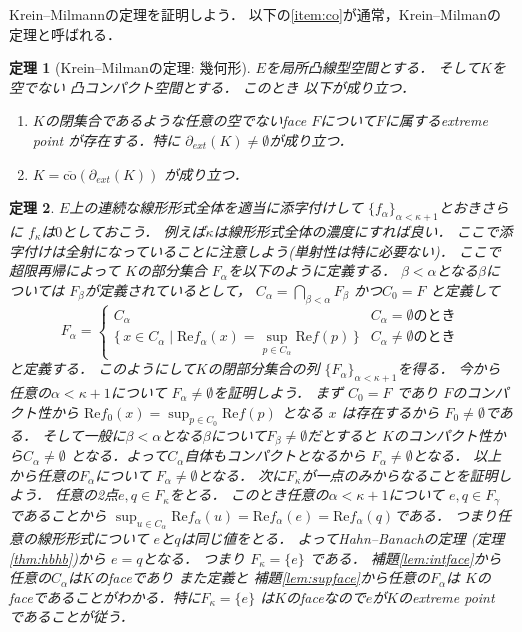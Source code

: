\documentclass[leqno, a4paper, 12pt]{jsarticle}
\newtheorem{thm}{定理}
\newcommand{\myre}{\mathrm{Re}}
\newcommand{\myextreme}[1]{\partial_{ext}(#1)}
\newcommand{\mycco}[1]{\overline{\mathrm{co}}(#1)}
\begin{document}
Krein--Milmannの定理を証明しよう．
以下の\ref{item:co}が通常，Krein--Milmanの定理と呼ばれる．
\begin{thm}[Krein--Milmanの定理: 幾何形]
$E$を局所凸線型空間とする．
そして$K$を
空でない
凸コンパクト空間とする．
このとき
以下が成り立つ．
\begin{enumerate}[label=\textup{(\arabic*)}]
\item\label{item:nonempty}
$K$の閉集合であるような任意の空でないface $F$について$F$に属するextreme point が存在する．特に
$\myextreme{K}\neq \emptyset$が成り立つ．
\item\label{item:co}
$K=\mycco{\myextreme{K}}$
が成り立つ．
\end{enumerate}
\end{thm}
\begin{thm}
$E$上の連続な線形形式全体を適当に添字付けして
$\{f_{\alpha}\}_{\alpha<\kappa+1}$とおきさらに
$f_{\kappa}$は$0$としておこう．
例えば$\kappa$は線形形式全体の濃度にすれば良い．
ここで添字付けは全射になっていることに注意しよう(単射性は特に必要ない)．
ここで超限再帰によって
$K$の部分集合
$F_{\alpha}$を以下のように定義する．
$\beta<\alpha$となる$\beta$については
$F_{\beta}$が定義されているとして，
$C_{\alpha}=\bigcap_{\beta<\alpha}F_{\beta}$
かつ$C_{0}=F$
と定義して
\[
F_{\alpha}
=
\begin{cases}
C_{\alpha} & \text{$C_{\alpha}=\emptyset$のとき}\\
\{\, x\in C_{\alpha}\mid \myre f_{\alpha}(x)=\sup_{p\in C_{\alpha}}\myre f(p)\, \} & \text{$C_{\alpha}\neq\emptyset$のとき}
\end{cases}
\]
と定義する．
このようにして$K$の閉部分集合の列
$\{F_{\alpha}\}_{\alpha<\kappa+1}$を得る．
今から任意の$\alpha<\kappa+1$について
$F_{\alpha}\neq \emptyset$を証明しよう．
まず
$C_{0}=F$
であり
$F$のコンパクト性から
$\myre f_{0}(x)=\sup_{p\in C_{0}}\myre f(p)$
となる
$x$
は存在するから
$F_{0}\neq \emptyset$である．
そして一般に$\beta<\alpha$となる$\beta$について$F_{\beta}\neq \emptyset$だとすると
$K$のコンパクト性から$C_{\alpha}\neq \emptyset$
となる．よって$C_{\alpha}$自体もコンパクトとなるから
$F_{\alpha}\neq \emptyset$となる．
以上から任意の$F_{\alpha}$について
$F_{\alpha}\neq\emptyset$となる．
次に$F_{\kappa}$が一点のみからなることを証明しよう．
任意の2点$e, q\in F_{\kappa}$をとる．
このとき任意の$\alpha<\kappa+1$について
$e, q\in F_{\gamma}$であることから
$\sup_{{u\in C_{\alpha}}}\myre f_{\alpha}(u)=\myre f_{\alpha}(e)=\myre f_{\alpha}(q)$である．
つまり任意の線形形式について
$e$と$q$は同じ値をとる．
よってHahn--Banachの定理
(定理\ref{thm:hbhb})から
$e=q$となる．
つまり
$F_{\kappa}=\{e\}$
である．
補題\ref{lem:intface}から
任意の$C_{\alpha}$は$K$のfaceであり
また定義と
補題\ref{lem:supface}から任意の$F_{\alpha}$は
$K$のfaceであることがわかる．特に$F_{\kappa}=\{e\}$
は$K$のfaceなので$e$が$K$のextreme point であることが従う．




\end{thm}
\end{document}
